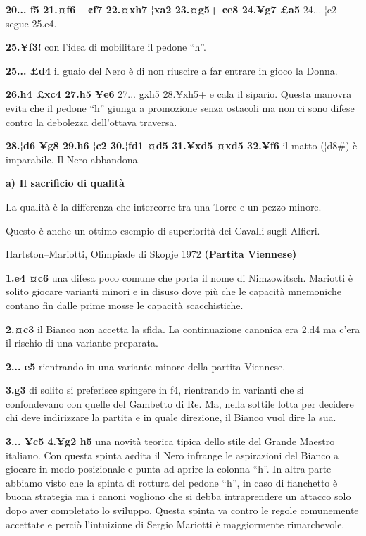 \documentclass[
]{article}
\begin{document}
\textbf{20... f5 21.¤f6+ ¢f7 22.¤xh7 ¦xa2 23.¤g5+ ¢e8 24.¥g7 £a5} 24...
¦c2 segue 25.e4.

\textbf{25.¥f3!} con l'idea di mobilitare il pedone ``h''.

\textbf{25... £d4} il guaio del Nero è di non riuscire a far entrare in
gioco la Donna.

\textbf{26.h4 £xc4 27.h5 ¥e6} 27... gxh5 28.¥xh5+ e cala il sipario.
Questa manovra evita che il pedone ``h'' giunga a promozione senza
ostacoli ma non ci sono difese contro la debolezza dell'ottava traversa.

\textbf{28.¦d6 ¥g8 29.h6 ¦c2 30.¦fd1 ¤d5 31.¥xd5 ¤xd5 32.¥f6} il matto
(¦d8\#) è imparabile. Il Nero abbandona.

\textbf{a) Il sacrificio di qualità}

La qualità è la differenza che intercorre tra una Torre e un pezzo
minore.

Questo è anche un ottimo esempio di superiorità dei Cavalli sugli
Alfieri.

Hartston--Mariotti, Olimpiade di Skopje 1972 \textbf{(Partita Viennese)}

\textbf{1.e4 ¤c6} una difesa poco comune che porta il nome di
Nimzowitsch. Mariotti è solito giocare varianti minori e in disuso dove
più che le capacità mnemoniche contano fin dalle prime mosse le capacità
scacchistiche.

\textbf{2.¤c3} il Bianco non accetta la sfida. La continuazione canonica
era 2.d4 ma c'era il rischio di una variante preparata.

\textbf{2... e5} rientrando in una variante minore della partita
Viennese.

\textbf{3.g3} di solito si preferisce spingere in f4, rientrando in
varianti che si confondevano con quelle del Gambetto di Re. Ma, nella
sottile lotta per decidere chi deve indirizzare la partita e in quale
direzione, il Bianco vuol dire la sua.

\textbf{3... ¥c5 4.¥g2 h5} una novità teorica tipica dello stile del
Grande Maestro italiano. Con questa spinta a¢dita il Nero infrange le
aspirazioni del Bianco a giocare in modo posizionale e punta ad aprire
la colonna ``h''. In altra parte abbiamo visto che la spinta di rottura
del pedone ``h'', in caso di fianchetto è buona strategia ma i canoni
vogliono che si debba intraprendere un attacco solo dopo aver completato
lo sviluppo. Questa spinta va contro le regole comunemente accettate e
perciò l'intuizione di Sergio Mariotti è maggiormente rimarchevole.
\end{document}
